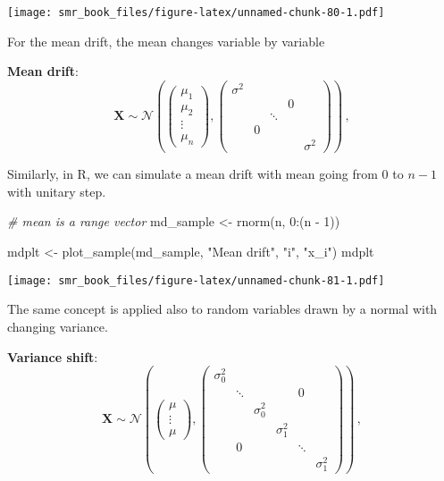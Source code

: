 \documentclass[
  oneside]{book}
\newenvironment{Shaded}{\begin{snugshade}}{\end{snugshade}}
\newcommand{\CommentTok}[1]{\textcolor[rgb]{0.56,0.35,0.01}{\textit{#1}}}
\newcommand{\DecValTok}[1]{\textcolor[rgb]{0.00,0.00,0.81}{#1}}
\newcommand{\FunctionTok}[1]{\textcolor[rgb]{0.00,0.00,0.00}{#1}}
\newcommand{\NormalTok}[1]{#1}
\newcommand{\OtherTok}[1]{\textcolor[rgb]{0.56,0.35,0.01}{#1}}
\newcommand{\SpecialCharTok}[1]{\textcolor[rgb]{0.00,0.00,0.00}{#1}}
\newcommand{\StringTok}[1]{\textcolor[rgb]{0.31,0.60,0.02}{#1}}
\begin{document}
\texttt{[image: smr\_book\_files/figure-latex/unnamed-chunk-80-1.pdf]}

For the mean drift, the mean changes variable by variable

\textbf{Mean drift}:
\[
\mathbf{X} \sim \mathcal{N}\left(
\begin{pmatrix}
\mu_1 \\ \mu_2 \\ \vdots \\ \mu_n
\end{pmatrix}, 
\begin{pmatrix}
\sigma^2 & & & & \\
 & & & 0 & \\
 & & \ddots & &  \\
 & 0 & & & \\
 & & & & \sigma^2
\end{pmatrix}
\right)\,,
\]

Similarly, in R, we can simulate a mean drift with
mean going from \(0\) to \(n-1\) with unitary step.

\begin{Shaded}
\begin{Highlighting}[]
\CommentTok{\# mean is a range vector}
\NormalTok{md\_sample }\OtherTok{\textless{}{-}} \FunctionTok{rnorm}\NormalTok{(n, }\DecValTok{0}\SpecialCharTok{:}\NormalTok{(n }\SpecialCharTok{{-}} \DecValTok{1}\NormalTok{))}

\NormalTok{mdplt }\OtherTok{\textless{}{-}} \FunctionTok{plot\_sample}\NormalTok{(md\_sample, }\StringTok{"Mean drift"}\NormalTok{, }\StringTok{"i"}\NormalTok{, }\StringTok{"x\_i"}\NormalTok{)}
\NormalTok{mdplt}
\end{Highlighting}
\end{Shaded}

\texttt{[image: smr\_book\_files/figure-latex/unnamed-chunk-81-1.pdf]}

The same concept is applied also to random variables
drawn by a normal with changing variance.

\textbf{Variance shift}:
\[
\mathbf{X} \sim \mathcal{N}\left(
\begin{pmatrix}
\mu \\ \vdots \\ \mu
\end{pmatrix}, 
\begin{pmatrix}
\sigma_0^2 & & & & & \\
 & \ddots & & & 0 & \\
 & & \sigma_0^2 & & & \\
 & & & \sigma_1^2 & & \\
 & 0 & & & \ddots & \\
 & & & & & \sigma_1^2
\end{pmatrix}
\right)\,,
\]
\end{document}
